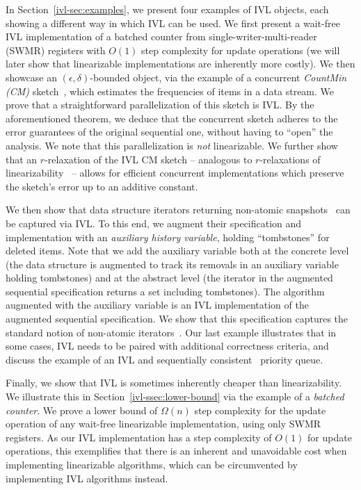 In Section~\ref{ivl-sec:examples}, we present four examples of IVL objects, each showing
a different way in which IVL can be used. We first present a wait-free IVL implementation of a batched counter from
single-writer-multi-reader (SWMR) registers with $O(1)$ step complexity for 
{\sc update} operations (we will later show that linearizable implementations are inherently more costly).
We then showcase an $(\epsilon, \delta)$-bounded object, via the example of a concurrent \emph{CountMin (CM)} sketch~\cite{CountMin},
which estimates the frequencies of items in a data stream. We prove that a straightforward
parallelization of this sketch is IVL. By the aforementioned theorem, we deduce that the concurrent sketch adheres
to the error guarantees of the original sequential one, without having to ``open'' the analysis. We note
that this parallelization is \emph{not} linearizable. We further show that an $r$-relaxation of the IVL CM sketch --
analogous to $r$-relaxations of linearizability~\cite{Henzinger} -- allows for efficient
concurrent implementations which preserve the sketch's error up to an additive constant.

We then show that data structure iterators returning non-atomic snapshots~\cite{arbel2018harnessing, meir2020oak}
can be captured via IVL. To this end, we augment their specification and implementation with
an \emph{auxiliary history variable}, holding ``tombstones'' for deleted items.
Note that we add the auxiliary variable both at the concrete level
(the data structure is augmented to track its removals in an auxiliary variable holding tombstones)
and at the abstract level (the iterator in the augmented sequential specification returns
a set including tombstones). The algorithm augmented with the auxiliary
variable is an IVL implementation of the augmented sequential specification.
We show that this specification captures the standard notion of
non-atomic iterators~\cite{arbel2018harnessing, meir2020oak}. Our last example illustrates
that in some cases, IVL needs to be paired with additional correctness criteria, and
discuss the example of an IVL and sequentially consistent~\cite{scheurich1987correct} priority queue.


Finally, we show that IVL is sometimes inherently cheaper than linearizability. We illustrate
this in Section~\ref{ivl-ssec:lower-bound} via the example of a \emph{batched counter}.
We prove a lower bound of $\Omega(n)$ step
complexity for the {\sc update} operation of any wait-free
linearizable implementation, using only SWMR registers. As our IVL implementation
has a step complexity of $O(1)$ for {\sc update} operations,
this exemplifies that there is an inherent and unavoidable
cost when implementing linearizable algorithms, which can be circumvented
by implementing IVL algorithms instead.